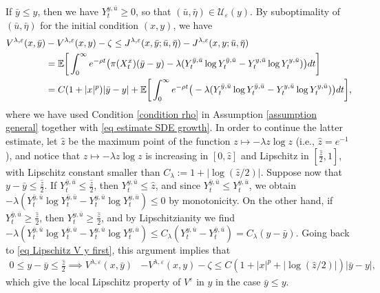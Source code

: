\documentclass[11pt]{amsart}
\theoremstyle{plain}
\def \dd{{\rm d}}
\numberwithin{equation}{section}
\begin{document}
If $\bar y \leq y$, then we have $Y^{y,\bar u}_t \geq0$, so that $(\bar u, \bar \eta) \in \mathcal U _\varepsilon (y)$.
By suboptimality of $(\bar u, \bar \eta)$  for the initial condition $(x,y)$, we have
\begin{equation}\label{eq Lipschitz V y first}
\begin{aligned}
V^{\lambda, \varepsilon}( x, \bar y) &- V^{\lambda, \varepsilon}(x,y) - \zeta 
\leq J^{\lambda, \varepsilon}( x, \bar y;\bar u, \bar \eta ) - J^{\lambda, \varepsilon}(x,y; \bar u ,\bar \eta) \\
 & = \mathbb E  \bigg[\int_0^\infty e ^{-\rho t} \big( \pi (X_t^{ x}) (\bar y - y) - \lambda (Y^{\bar y,\bar u}_t \log Y^{\bar y,\bar u}_t - Y^{y, \bar u}_t \log Y^{ y, \bar u}_t) \big) \dd t \bigg] \\
 & = C (1 + |x|^p) |\bar y - y| + \mathbb E  \bigg[\int_0^\infty e ^{-\rho t} \big( - \lambda (Y^{\bar y,\bar u}_t \log Y^{\bar y,\bar u}_t - Y^{y,\bar u}_t \log Y^{ y,\bar u}_t) \big) \dd t \bigg],
\end{aligned}
\end{equation}
where we have used Condition \ref{condition rho} in Assumption \ref{assumption general} together with \eqref{eq estimate SDE growth}.
In order to continue the latter estimate, let $\hat z$ be the maximum point of the function $z \mapsto - \lambda z \log z$ (i.e., $\hat z = e^{-1}$), and notice that $z \mapsto - \lambda z \log z$ is increasing in $[0,\hat z]$ and Lipschitz in $[\frac{\hat z}2, 1]$, with Lipschitz constant smaller than  $C_\lambda := 1 + |\log (\hat z /2)|$. 
Suppose now that $y - \bar y \leq \frac{\hat z}2$. 
If $Y^{\bar y,\bar u}_t \leq \frac{\hat z}2 $, then $ Y^{y,\bar u}_t \leq \hat z$, and since $Y^{\bar y,\bar u}_t \leq Y^{y,\bar u}_t$, we obtain $ - \lambda (Y^{\bar y,\bar u}_t \log Y^{\bar y,\bar u}_t - Y^{y,\bar u}_t \log Y^{ y,\bar u}_t) \leq 0$ by monotonicity.
On the other hand, if  $Y^{\bar y,\bar u}_t \geq \frac{\hat z}2 $, then $ Y^{y,\bar u}_t \geq \frac{\hat z}2$, and by Lipschitzianity we find
$ - \lambda (Y^{\bar y,\bar u}_t \log Y^{\bar y,\bar u}_t - Y^{y,\bar u}_t \log Y^{ y,\bar u}_t) \leq  C_\lambda (Y^{ y,\bar u}_t - Y^{\bar y,\bar u}_t) = C_\lambda (y-\bar y)$. 
Going back to \eqref{eq Lipschitz V y first}, this argument implies that
$$
\begin{aligned}
 0 \leq y - \bar y \leq \frac{\hat z}2 \implies V^{\lambda, \varepsilon}( x, \bar y) &- V^{\lambda, \varepsilon}(x,y) - \zeta 
\leq C (1 + |x|^p + |\log(\hat z /2)|) |\bar y - y|, 
\end{aligned}
$$
which give the local Lipschitz property of $V^\varepsilon$ in $y$ in the case $\bar y \leq y$.
\end{document}
